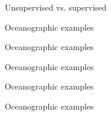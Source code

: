 \documentclass[xcolor=x11names,compress]{beamer}
\renewcommand{\(}{\begin{columns}}
\renewcommand{\)}{\end{columns}}
\newcommand{\<}[1]{\begin{column}{#1}}
\renewcommand{\>}{\end{column}}
\begin{document}
\begin{frame}{Unsupervised vs. supervised}
\end{frame}


\begin{frame}{Oceanographic examples}


\end{frame}


\begin{frame}{Oceanographic examples}


\end{frame}


\begin{frame}{Oceanographic examples}


\end{frame}


\begin{frame}{Oceanographic examples}


\end{frame}


\begin{frame}{Oceanographic examples}


\end{frame}

\end{document}
